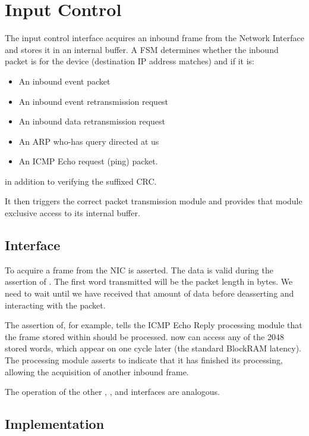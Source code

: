 \section{Input Control}

The input control interface acquires an inbound frame from the Network
Interface and stores it in an internal buffer. A FSM determines
whether the inbound packet is for the device (destination IP address
matches) and if it is: 

\begin{itemize}
\item An inbound event packet
\item An inbound event retransmission request
\item An inbound data retransmission request
\item An ARP who-has query directed at us
\item An ICMP Echo request (ping) packet. 
\end{itemize}

in addition to verifying the suffixed CRC. 

It then triggers the correct packet transmission module and provides
that module exclusive access to its internal buffer.


\subsection{Interface}
To acquire a frame from the NIC  is asserted.  The
data is valid during the assertion of . The first word
transmitted will be the packet length in bytes. We need to wait until
we have received that amount of data before deasserting
 and interacting with the packet.

The assertion of, for example,  tells the ICMP Echo
Reply processing module that the frame stored within should be
processed.  now can access any of the 2048
stored words, which appear on  one cycle later
(the standard BlockRAM latency). The processing module asserts
 to indicate that it has finished its processing,
allowing the acquisition of another inbound frame.

The operation of the other , , and
 interfaces are analogous.


\subsection{Implementation} 


